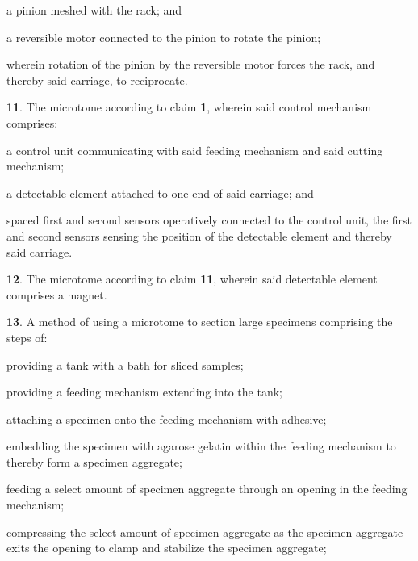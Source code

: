 \documentclass{article}
\begin{document}
\begin{hangpars}
\hspace*{1.5em}a pinion meshed with the rack; and

\hspace*{1.5em}a reversible motor connected to the pinion to rotate the pinion;

\hspace*{1.5em}wherein rotation of the pinion by the reversible motor forces the rack, and thereby said carriage, to reciprocate.

\textbf{11}. The microtome according to claim \textbf{1}, wherein said control mechanism comprises:

\hspace*{1.5em}a control unit communicating with said feeding mechanism and said cutting mechanism;

\hspace*{1.5em}a detectable element attached to one end of said carriage; and

\hspace*{1.5em}spaced first and second sensors operatively connected to the control unit, the first and second sensors sensing the position of the detectable element and thereby said carriage.

\textbf{12}. The microtome according to claim \textbf{11}, wherein said detectable element comprises a magnet.

\textbf{13}. A method of using a microtome to section large specimens comprising the steps of:

\hspace*{1.5em}providing a tank with a bath for sliced samples;

\hspace*{1.5em}providing a feeding mechanism extending into the tank;

\hspace*{1.5em}attaching a specimen onto the feeding mechanism with adhesive;

\hspace*{1.5em}embedding the specimen with agarose gelatin within the feeding mechanism to thereby form a specimen aggregate;

\hspace*{1.5em}feeding a select amount of specimen aggregate through an opening in the feeding mechanism;

\hspace*{1.5em}compressing the select amount of specimen aggregate as the specimen aggregate exits the opening to clamp and stabilize the specimen aggregate;


\end{hangpars}
\end{document}
